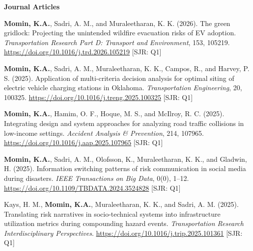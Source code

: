 \documentclass[a4paper,11pt]{article}
\begin{document}
\textcolor{mycolor}{\textbf{Journal Articles}}
\begin{enumerate}[leftmargin=*, labelsep=0em, align=left, widest={[\textbf{J.10}]}, itemindent=0em, label={\textbf{[J.\arabic*]}}]

\begin{justifying}

    \item \textbf{Momin, K.A.}, Sadri, A. M., and Muraleetharan, K. K. (2026). The green gridlock: Projecting the unintended wildfire evacuation risks of EV adoption. \textit{Transportation Research Part D: Transport and Environment}, 153, 105219. \href{https://doi.org/10.1016/j.trd.2026.105219}{https://doi.org/10.1016/j.trd.2026.105219} \hfill [\textcolor{mycolor}{SJR: Q1}]

    \item \textbf{Momin, K.A.}, Sadri, A. M., Muraleetharan, K. K., Campos, R., and Harvey, P. S. (2025). Application of multi-criteria decision analysis for optimal siting of electric vehicle charging stations in Oklahoma. \textit{Transportation Engineering}, 20, 100325. \href{https://doi.org/10.1016/j.treng.2025.100325}{https://doi.org/10.1016/j.treng.2025.100325} \hfill [\textcolor{mycolor}{SJR: Q1}]


    \item \textbf{Momin, K.A.}, Hamim, O. F., Hoque, M. S., and McIlroy, R. C. (2025). Integrating design and system approaches for analyzing road traffic collisions in low-income settings. \textit{Accident Analysis \& Prevention}, 214, 107965. \href{https://doi.org/10.1016/j.aap.2025.107965}{https://doi.org/10.1016/j.aap.2025.107965} \hfill [\textcolor{mycolor}{SJR: Q1}]

    \item \textbf{Momin, K.A.}, Sadri, A. M., Olofsson, K., Muraleetharan, K. K., and Gladwin, H. (2025). Information switching patterns of risk communication in social media during disasters. \textit{IEEE Transactions on Big Data}, 0(0), 1–12. \href{https://doi.org/10.1109/TBDATA.2024.3524828}{https://doi.org/10.1109/TBDATA.2024.3524828} \hfill [\textcolor{mycolor}{SJR: Q1}]

    \item Kays, H. M., \textbf{Momin, K.A.}, Muraleetharan, K. K., and Sadri, A. M. (2025). Translating risk narratives in socio-technical systems into infrastructure utilization metrics during compounding hazard events. \textit{Transportation Research Interdisciplinary Perspectives}. \href{https://doi.org/10.1016/j.trip.2025.101361}{https://doi.org/10.1016/j.trip.2025.101361} \hfill [\textcolor{mycolor}{SJR: Q1}]


\end{justifying}
\end{enumerate}
\end{document}
